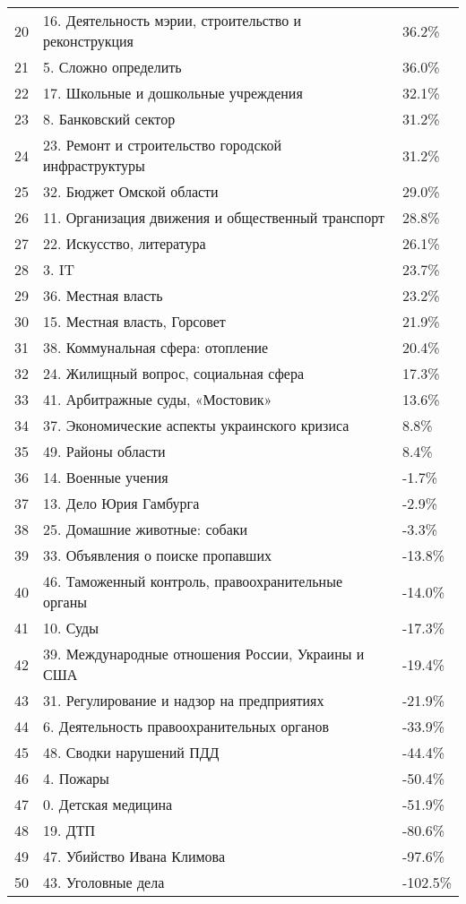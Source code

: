 \begin{longtable}[c]{| L{3cm} | C{7cm} | R{5cm} |}
		20 & 16. Деятельность мэрии, строительство и реконструкция & 36.2\% \\
		21 & 5. Сложно определить & 36.0\% \\
		22 & 17. Школьные и дошкольные учреждения & 32.1\% \\
		23 & 8. Банковский сектор & 31.2\% \\
		24 & 23. Ремонт и строительство городской инфраструктуры & 31.2\% \\
		25 & 32. Бюджет Омской области & 29.0\% \\
		26 & 11. Организация движения и общественный транспорт & 28.8\% \\
		27 & 22. Искусство, литература & 26.1\% \\
		28 & 3. IT & 23.7\% \\
		29 & 36. Местная власть & 23.2\% \\
		30 & 15. Местная власть, Горсовет & 21.9\% \\
		31 & 38. Коммунальная сфера: отопление & 20.4\% \\
		32 & 24. Жилищный вопрос, социальная сфера & 17.3\% \\
		33 & 41. Арбитражные суды, «Мостовик» & 13.6\% \\
		34 & 37. Экономические аспекты украинского кризиса & 8.8\% \\
		35 & 49. Районы области & 8.4\% \\
		36 & 14. Военные учения & -1.7\% \\
		37 & 13. Дело Юрия Гамбурга & -2.9\% \\
		38 & 25. Домашние животные: собаки & -3.3\% \\
		39 & 33. Объявления о поиске пропавших & -13.8\% \\
		40 & 46. Таможенный контроль, правоохранительные органы & -14.0\% \\
		41 & 10. Суды & -17.3\% \\
		42 & 39. Международные отношения России, Украины и США & -19.4\% \\
		43 & 31. Регулирование и надзор на предприятиях & -21.9\% \\
		44 & 6. Деятельность правоохранительных органов & -33.9\% \\
		45 & 48. Сводки нарушений ПДД & -44.4\% \\
		46 & 4. Пожары & -50.4\% \\
		47 & 0. Детская медицина & -51.9\% \\
		48 & 19. ДТП & -80.6\% \\
		49 & 47. Убийство Ивана Климова & -97.6\% \\
		50 & 43. Уголовные дела & -102.5\% \\
	\hline
\end{longtable}